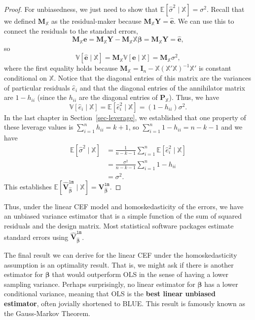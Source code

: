\documentclass[
  letterpaper,
  DIV=11,
  numbers=noendperiod]{scrreprt}
\newcommand{\mb}{\symbf}
\newcommand{\E}{\mathbb{E}}
\newcommand{\V}{\mathbb{V}}
\newcommand{\Xmat}{\mathbb{X}}
\newcommand{\bfbeta}{\mb{\beta}}
\newcommand{\bhat}{\widehat{\mb{\beta}}}
\theoremstyle{plain}
\theoremstyle{definition}
\theoremstyle{definition}
\theoremstyle{remark}
\begin{document}
\begin{proof}
For unbiasedness, we just need to show that
\(\E[\widehat{\sigma}^{2} \mid \Xmat] = \sigma^2\). Recall that we
defined \(\mb{M}_{\Xmat}\) as the residual-maker because
\(\mb{M}_{\Xmat}\mb{Y} = \widehat{\mb{e}}\). We can use this to connect
the residuals to the standard errors, \[ 
\mb{M}_{\Xmat}\mb{e} = \mb{M}_{\Xmat}\mb{Y} - \mb{M}_{\Xmat}\Xmat\bfbeta = \mb{M}_{\Xmat}\mb{Y} = \widehat{\mb{e}},
\] so \[
\V[\widehat{\mb{e}} \mid \Xmat] = \mb{M}_{\Xmat}\V[\mb{e} \mid \Xmat] = \mb{M}_{\Xmat}\sigma^2,
\] where the first equality holds because
\(\mb{M}_{\Xmat} = \mb{I}_{n} - \Xmat (\Xmat'\Xmat)^{-1} \Xmat'\) is
constant conditional on \(\Xmat\). Notice that the diagonal entries of
this matrix are the variances of particular residuals \(\widehat{e}_i\)
and that the diagonal entries of the annihilator matrix are
\(1 - h_{ii}\) (since the \(h_{ii}\) are the diagonal entries of
\(\mb{P}_{\Xmat}\)). Thus, we have \[ 
\V[\widehat{e}_i \mid \Xmat] = \E[\widehat{e}_{i}^{2} \mid \Xmat] = (1 - h_{ii})\sigma^{2}.
\] In the last chapter in Section~\ref{sec-leverage}, we established
that one property of these leverage values is
\(\sum_{i=1}^n h_{ii} = k+ 1\), so
\(\sum_{i=1}^n 1- h_{ii} = n - k - 1\) and we have \[ 
\begin{aligned}
  \E[\widehat{\sigma}^{2} \mid \Xmat] &= \frac{1}{n-k-1} \sum_{i=1}^{n} \E[\widehat{e}_{i}^{2} \mid \Xmat] \\
                                      &= \frac{\sigma^{2}}{n-k-1} \sum_{i=1}^{n} 1 - h_{ii} \\
                                      &= \sigma^{2}. 
\end{aligned}
\] This establishes
\(\E[\widehat{\mb{V}}^{\texttt{lm}}_{\bhat} \mid \Xmat] = \mb{V}^{\texttt{lm}}_{\bhat}\).

\end{proof}

Thus, under the linear CEF model and homoskedasticity of the errors, we
have an unbiased variance estimator that is a simple function of the sum
of squared residuals and the design matrix. Most statistical software
packages estimate standard errors using
\(\widehat{\mb{V}}^{\texttt{lm}}_{\bhat}\).

The final result we can derive for the linear CEF under the
homoskedasticity assumption is an optimality result. That is, we might
ask if there is another estimator for \(\bfbeta\) that would outperform
OLS in the sense of having a lower sampling variance. Perhaps
surprisingly, no linear estimator for \(\bfbeta\) has a lower
conditional variance, meaning that OLS is the \textbf{best linear
unbiased estimator}, often jovially shortened to BLUE. This result is
famously known as the Gauss-Markov Theorem.
\end{document}
